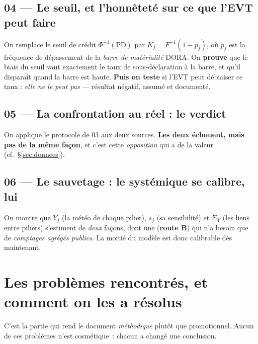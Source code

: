 \documentclass[11pt,a4paper]{article}
\newcommand{\Y}{Y}
\begin{document}
\subsection{04 --- Le seuil, et l'honnêteté sur ce que l'EVT peut faire}
On remplace le seuil de crédit $\Phi^{-1}(\mathrm{PD})$ par $K_j=F^{-1}(1-p_j)$, où $p_j$ est
la fréquence de dépassement de la \emph{barre de matérialité} DORA. On \textbf{prouve} que le
biais du seuil vaut exactement le taux de sous-déclaration à la barre, et qu'il disparaît quand
la barre est haute. \textbf{Puis on teste} si l'EVT peut débiaiser ce taux : \emph{elle ne le
peut pas} --- résultat négatif, assumé et documenté.

\subsection{05 --- La confrontation au réel : le verdict}
On applique le protocole de 03 aux deux sources. \textbf{Les deux échouent, mais pas de la même
façon}, et c'est cette \emph{opposition} qui a de la valeur (cf.~§\ref{sec:donnees}).

\subsection{06 --- Le sauvetage : le systémique se calibre, lui}
On montre que $\Y_j$ (la \og{}météo\fg{} de chaque pilier), $s_j$ (sa sensibilité) et
$\Sigma_Y$ (les liens entre piliers) s'estiment de \emph{deux} façons, dont une
(\textbf{route B}) qui n'a besoin que de \emph{comptages agrégés publics}. La moitié du modèle
est donc calibrable dès maintenant.

\section{Les problèmes rencontrés, et comment on les a résolus}
\label{sec:problemes}

C'est la partie qui rend le document \emph{méthodique} plutôt que promotionnel. Aucun de ces
problèmes n'est cosmétique~: chacun a changé une conclusion.
\end{document}
